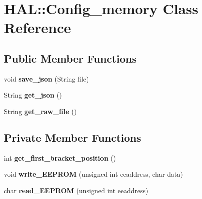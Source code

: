 \hypertarget{class_h_a_l_1_1_config__memory}{}\section{H\+AL\+:\+:Config\+\_\+memory Class Reference}
\label{class_h_a_l_1_1_config__memory}
\subsection*{Public Member Functions}
\begin{DoxyCompactItemize}
\item 
\mbox{\label{class_h_a_l_1_1_config__memory_acdd5a5390f63d12af8ad0c5f9b015b75}} 
void {\bfseries save\+\_\+json} (String file)
\item 
\mbox{\label{class_h_a_l_1_1_config__memory_a931533a7085c8cd33a1b2840a8e36b86}} 
String {\bfseries get\+\_\+json} ()
\item 
\mbox{\label{class_h_a_l_1_1_config__memory_ae79c091056afee1296042b23eb607d7a}} 
String {\bfseries get\+\_\+raw\+\_\+file} ()
\end{DoxyCompactItemize}
\subsection*{Private Member Functions}
\begin{DoxyCompactItemize}
\item 
\mbox{\label{class_h_a_l_1_1_config__memory_a39c2616757692aed90fcfc4aa30fc35f}} 
int {\bfseries get\+\_\+first\+\_\+bracket\+\_\+position} ()
\item 
\mbox{\label{class_h_a_l_1_1_config__memory_aef43e9ebb97962c33f7473357ae2a0a5}} 
void {\bfseries write\+\_\+\+E\+E\+P\+R\+OM} (unsigned int eeaddress, char data)
\item 
\mbox{\label{class_h_a_l_1_1_config__memory_a6147cd3f9b3eb9d542bf4b950aa45684}} 
char {\bfseries read\+\_\+\+E\+E\+P\+R\+OM} (unsigned int eeaddress)
\end{DoxyCompactItemize}
